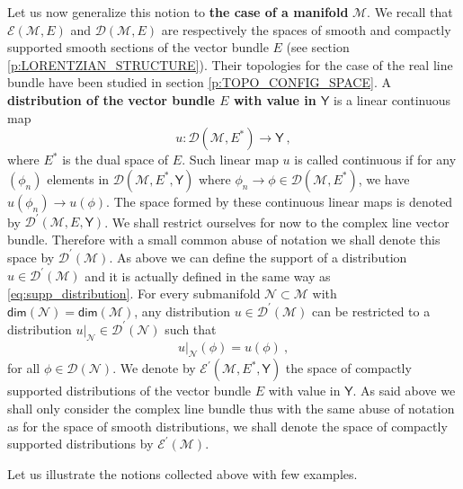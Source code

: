\documentclass[11pt]{book}
\renewcommand{\dim}{\mathsf{dim}}
\newcommand{\Dcal}{\mathcal{D}}
\newcommand{\Ecal}{\mathcal{E}}
\newcommand{\Mcal}{\mathcal{M}}
\newcommand{\Ncal}{\mathcal{N}}
\newcommand{\Ysf}{\mathsf{Y}}
\theoremstyle{break}
\begin{document}
\bigskip


Let us now generalize this notion to \textbf{the case of a manifold} $\Mcal$. We recall that $\Ecal(\Mcal,E)$ and $\Dcal(\Mcal,E)$ are respectively the spaces of smooth and compactly supported smooth sections of the vector bundle $E$ (see section \ref{p:LORENTZIAN_STRUCTURE}). Their topologies for the case of the real line bundle have been studied in section \ref{p:TOPO_CONFIG_SPACE}. A \textbf{distribution of the vector bundle $E$ with value in $\Ysf$} is a linear continuous map 
%
\begin{equation*}
u : \Dcal(\Mcal,E^\ast) \to \Ysf \ ,
\end{equation*}
%
where $E^\ast$ is the dual space of $E$. Such linear map $u$ is called continuous if for any $(\phi_n)$ elements in $\Dcal(\Mcal,E^\ast,\Ysf)$ where $\phi_n \to \phi \in \Dcal(\Mcal,E^\ast)$, we have $u(\phi_n) \to u(\phi)$. The space formed by these continuous linear maps is denoted by $\Dcal^\prime(\Mcal,E,\Ysf)$. We shall restrict ourselves for now to the complex line vector bundle. Therefore with a small common abuse of notation we shall denote this space by $\Dcal^\prime(\Mcal)$. As above we can define the support of a distribution $u \in \Dcal^\prime(\Mcal)$ and it is actually defined in the same way as \eqref{eq:supp_distribution}. For every submanifold $\Ncal \subset \Mcal$ with $\dim(\Ncal) = \dim(\Mcal)$, any distribution $u \in \Dcal^\prime(\Mcal)$ can be restricted to a distribution $\left.u\right|_{\Ncal} \in \Dcal^\prime(\Ncal)$ such that
%
\begin{equation*}
\left.u\right|_{\Ncal}(\phi) = u(\phi) \ , 
\end{equation*}
%
for all $\phi \in \Dcal(\Ncal)$. We denote by $\Ecal^\prime(\Mcal,E^\ast,\Ysf)$ the space of compactly supported distributions of the vector bundle $E$ with value in $\Ysf$. As said above we shall only consider the complex line bundle thus with the same abuse of notation as for the space of smooth distributions, we shall denote the space of compactly supported distributions by $\Ecal^\prime(\Mcal)$.


\bigskip


Let us illustrate the notions collected above with few examples. 
\end{document}
